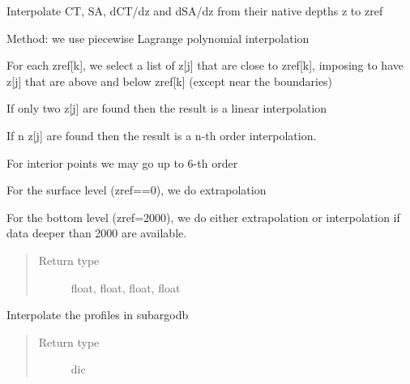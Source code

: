 \documentclass[letterpaper,10pt,english]{sphinxmanual}
\begin{document}
\begin{fulllineitems}
\label{\detokenize{pargopy:pargopy.interpolation_tools.interp_at_zref}}
Interpolate CT, SA, dCT/dz and dSA/dz from their native depths z to
zref

Method: we use piecewise Lagrange polynomial interpolation

For each zref{[}k{]}, we select a list of z{[}j{]} that are close to
zref{[}k{]}, imposing to have z{[}j{]} that are above and below zref{[}k{]}
(except near the boundaries)

If only two z{[}j{]} are found then the result is a linear interpolation

If n z{[}j{]} are found then the result is a n-th order interpolation.

For interior points we may go up to 6-th order

For the surface level (zref==0), we do extrapolation

For the bottom level (zref=2000), we do either extrapolation or
interpolation if data deeper than 2000 are available.
\begin{quote}\begin{description}
\item[{Return type}] \leavevmode
float, float, float, float

\end{description}\end{quote}

\end{fulllineitems}


\begin{fulllineitems}
\label{\detokenize{pargopy:pargopy.interpolation_tools.interpolate_profiles}}
Interpolate the profiles in subargodb
\begin{quote}\begin{description}
\item[{Return type}] \leavevmode
dic

\end{description}\end{quote}

\end{fulllineitems}
\end{document}
